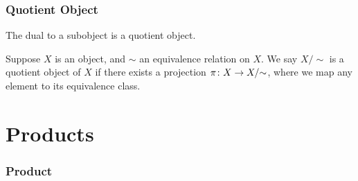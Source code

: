 
\subsubsection*{Quotient Object}

\begin{remark}
    The dual to a subobject is a quotient object.
\end{remark}
\begin{definition}
    Suppose \(X\) is an object, and \(\sim\) an equivalence relation on \(X\).
    We say \(X/{\sim}\) is a quotient object of \(X\)
    if there exists a projection \(\pi\colon X\to X/{\sim}\),
    where we map any element to its equivalence class.
\end{definition}



\section{Products}

\subsubsection*{Product}

